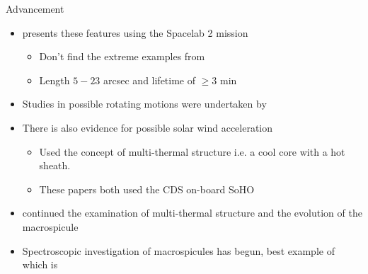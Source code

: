 \documentclass{beamer}
\begin{document}
	\begin{frame}{Advancement}
		\begin{itemize}
			\item{\cite{Dere89} presents these features using the Spacelab 2 mission}
				\begin{itemize}
					\item{Don't find the extreme examples from \cite{Bohlin1975}}
					\item{Length $5 - 23$ arcsec and lifetime of $\geq 3$ min}
				\end{itemize}
			\item{Studies in possible rotating motions were undertaken by \cite{Pike_Mason1998}}
			\item{There is also evidence for possible solar wind acceleration \cite{Pike_Harrison1997}}
				\begin{itemize}
					\item{Used the concept of multi-thermal structure i.e. a cool core with a hot sheath.}
					\item{These papers both used the CDS on-board SoHO} 
				\end{itemize}
			\item{\cite{Parenti2002} continued the examination of multi-thermal structure and the evolution of the macrospicule}
			\item{Spectroscopic investigation of macrospicules has begun, best example of which is \cite{Scullion2010}}
		\end{itemize}
	\end{frame}
	
\end{document}
